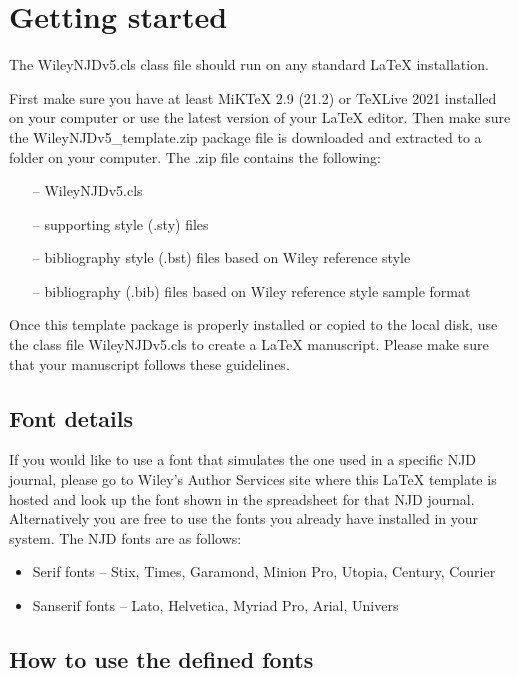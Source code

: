 \documentclass[11pt]{article}
\begin{document}
\section{Getting started}
\label{sec2} %

The WileyNJDv5.cls class f{i}le should run
on any standard LaTeX installation.\vskip6pt

 First make sure you have at least MiKTeX 2.9 (21.2) or TeXLive 2021 installed on your computer or use the latest version of your LaTeX editor. Then make sure the WileyNJDv5\_template.zip package f{i}le is downloaded and extracted to a folder on your computer. The .zip f{i}le contains the following:
\begin{itemize}
\item[--] WileyNJDv5.cls
\item[--] supporting style (.sty) f{i}les
\item[--] bibliography style (.bst) f{i}les based on Wiley reference style
\item[--] bibliography (.bib) f{i}les based on Wiley reference style sample format
\end{itemize}

 Once this template package is properly installed or copied to the local disk, use the  class f{i}le  WileyNJDv5.cls  to create a LaTeX manuscript. Please make sure that your manuscript follows these guidelines.


\subsection{Font details}
If you would like to use a font that simulates the one used in a specif{i}c NJD journal, please go to Wiley's Author Services site where this LaTeX template is hosted and look up the font shown in the spreadsheet
for that NJD journal.  Alternatively you are free to use the fonts you already have installed in your system. The NJD fonts are as follows:
\begin{itemize}
\item Serif fonts -- Stix, Times, Garamond, Minion Pro, Utopia, Century, Courier
\item Sanserif fonts -- Lato, Helvetica, Myriad Pro, Arial, Univers
\end{itemize}


\subsection{How to use the def{i}ned fonts}
\end{document}
